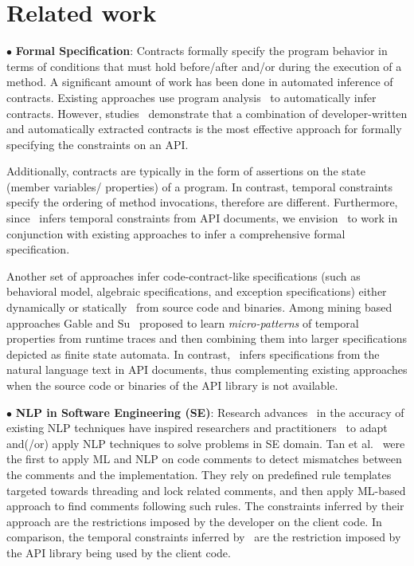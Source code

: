 \section{Related work}
\label{sec:related}

{\small $\bullet$} \textbf{Formal Specification}:
Contracts formally specify the program behavior in terms of conditions that must hold before/after and/or during the execution of a method.
A significant amount of work has been done in automated inference of contracts.
Existing approaches use program analysis~\cite{csallner08dysy,NimmerE02:ISSTA,Tillmann:2006:DLM:2105385.2105433}
to automatically infer contracts.
However, studies~\cite{Polikarpova2009ISSTA,Flanagan2001:HAA} demonstrate that a combination of developer-written and automatically extracted
contracts is the most effective approach for formally specifying the constraints on an API.

Additionally, contracts are typically in the form of assertions on the state (member variables/ properties) of a program. In contrast, temporal constraints specify the ordering of method invocations, therefore are different.
Furthermore, since \tool\ infers temporal constraints from API documents, we envision \tool\ to work in conjunction with existing approaches
to infer a comprehensive formal specification.
 
Another set of approaches infer code-contract-like specifications (such as behavioral model, algebraic specifications, and exception specifications) either dynamically\cite{Henkel07discoveringdocumentation,Ghezzi:2009:SIB:1555001.1555057,Henkel:2008:DDA:1363102.1363105} or statically~\cite{Flanagan2001:HAA,Buse:2008:ADI:1390630.1390664,wasylkowski2011mining} from source code and binaries. 
Among mining based approaches Gable and Su~\cite{gabel2008javert} proposed to learn  
\textit{micro-patterns} of temporal properties from runtime traces and then combining them into larger specifications depicted as finite state automata.
In contrast, \tool\ infers specifications from the natural language text in API documents,
thus complementing existing approaches when the source code or binaries of the API library is not available.


{\small $\bullet$} \textbf{NLP in Software Engineering (SE)}:
Research advances~\cite{Marneffe08COLING,KleinNIPS03} in the accuracy of existing NLP techniques have inspired researchers and practitioners~\cite{pandita12:inferring, pandita13:WHYPER, johnSlankasPASSAT13, XiaoFSE2012, thummalapentaICSE12} to adapt and(/or) apply NLP techniques to solve problems in SE domain. 
Tan et al.~\cite{TanSOSP07} were the first to apply ML and NLP on code comments to detect mismatches between the comments and the implementation.
They rely on predefined rule templates targeted towards threading and lock related comments, and then apply ML-based approach to find comments following such rules.
The constraints inferred by their approach are the restrictions imposed by the developer on the client code.
In comparison, the temporal constraints inferred by \tool\ are the restriction imposed by the API library being used by the client code.

